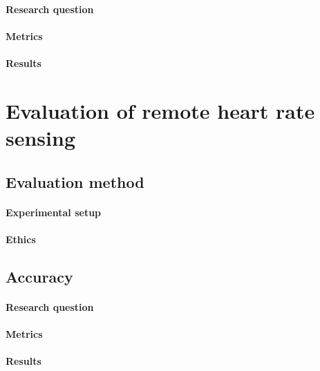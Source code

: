\paragraph{Research question}
\paragraph{Metrics}
\paragraph{Results}


\section{Evaluation of remote heart rate sensing}
\subsection{Evaluation method}
\paragraph{Experimental setup}
\paragraph{Ethics}
\subsection{Accuracy}
\paragraph{Research question}
\paragraph{Metrics}
\paragraph{Results}


